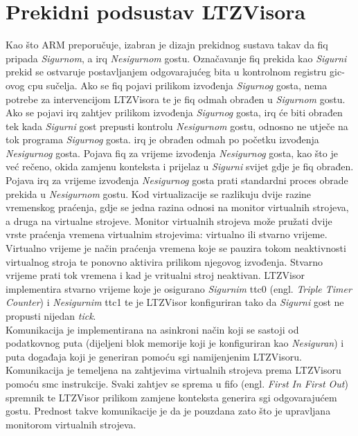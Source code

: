 \documentclass[times, utf8, diplomski, numeric]{fer}
\begin{document}
\section{Prekidni podsustav LTZVisora}
Kao što ARM preporučuje, izabran je dizajn prekidnog sustava takav da \gls{fiq} pripada \textit{Sigurnom}, a \gls{irq} \textit{Nesigurnom} gostu. Označavanje
\gls{fiq} prekida kao \textit{Sigurni} prekid se ostvaruje postavljanjem odgovarajućeg bita u kontrolnom registru \gls{gic}-ovog \gls{cpu} sučelja.
Ako se \gls{fiq} pojavi prilikom izvođenja \textit{Sigurnog} gosta, nema potrebe za intervencijom LTZVisora te je \gls{fiq} odmah obrađen u
\textit{Sigurnom} gostu. Ako se pojavi \gls{irq} zahtjev prilikom izvođenja \textit{Sigurnog} gosta, \gls{irq} će biti obrađen tek kada \textit{Sigurni} gost prepusti
kontrolu \textit{Nesigurnom} gostu, odnosno ne utječe na tok programa \textit{Sigurnog} gosta. \gls{irq} je obrađen odmah po početku izvođenja
\textit{Nesigurnog} gosta. Pojava \gls{fiq} za vrijeme izvođenja \textit{Nesigurnog} gosta, kao što je već rečeno, okida zamjenu konteksta i prijelaz
u \textit{Sigurni} svijet gdje je \gls{fiq} obrađen. Pojava \gls{irq} za vrijeme izvođenja \textit{Nesigurnog} gosta prati standardni proces obrade prekida
u \textit{Nesigurnom} gostu. Kod virtualizacije se razlikuju dvije razine vremenskog praćenja, gdje se jedna razina odnosi na monitor
virtualnih strojeva, a druga na virtualne strojeve. Monitor virtualnih strojeva može pružati dvije vrste praćenja vremena
virtualnim strojevima: virtualno ili stvarno vrijeme. Virtualno vrijeme je način praćenja vremena koje se pauzira tokom
neaktivnosti virtualnog stroja te ponovno aktivira prilikom njegovog izvođenja. Stvarno vrijeme prati tok vremena i kad je
vritualni stroj neaktivan. LTZVisor implementira stvarno vrijeme koje je osigurano \textit{Sigurnim} \gls{ttc}0 (engl. \textit{Triple Timer
Counter}) i \textit{Nesigurnim} \gls{ttc}1 te je LTZVisor konfiguriran tako da \textit{Sigurni} gost ne propusti nijedan \textit{tick}.\\
Komunikacija je implementirana na asinkroni način koji se sastoji od podatkovnog puta (dijeljeni blok memorije koji je
konfiguriran kao \textit{Nesiguran}) i puta događaja koji je generiran pomoću \gls{sgi} namijenjenim LTZVisoru. Komunikacija je temeljena
na zahtjevima virtualnih strojeva prema LTZVisoru pomoću \gls{smc} instrukcije. Svaki zahtjev se sprema u \gls{fifo} (engl. \textit{First
In First Out}) spremnik te LTZVisor prilikom zamjene konteksta generira \gls{sgi} odgovarajućem gostu. Prednost takve komunikacije
je da je pouzdana zato što je upravljana monitorom virtualnih strojeva.
\end{document}
